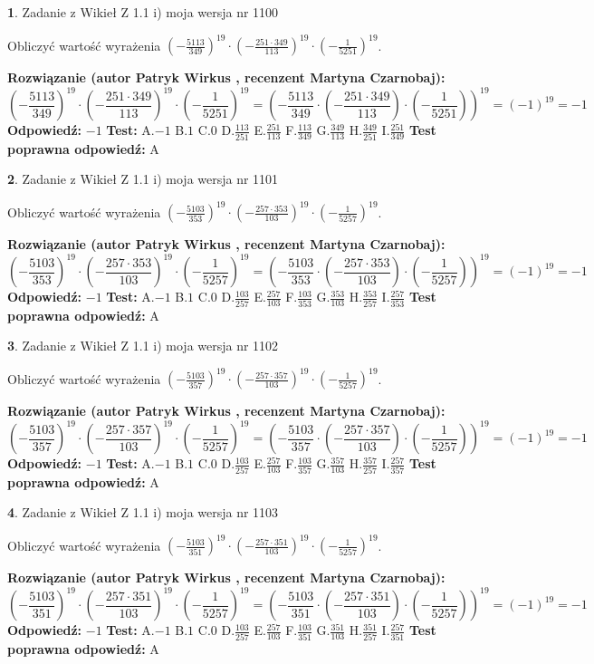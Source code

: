 \documentclass[12pt, a4paper]{article}
\theoremstyle{definition} %
\newtheorem{zad}{}
\newcommand{\zadStart}[1]{\begin{zad}#1\newline}
\newcommand{\zadStop}{\end{zad}}
\newcommand{\rozwStart}[2]{\noindent \textbf{Rozwiązanie (autor #1 , recenzent #2): }\newline}
\newcommand{\rozwStop}{\newline}
\newcommand{\odpStart}{\noindent \textbf{Odpowiedź:}\newline}
\newcommand{\odpStop}{\newline}
\newcommand{\testStart}{\noindent \textbf{Test:}\newline}
\newcommand{\testStop}{\newline}
\newcommand{\kluczStart}{\noindent \textbf{Test poprawna odpowiedź:}\newline}
\newcommand{\kluczStop}{\newline}
\begin{document}
\zadStart{Zadanie z Wikieł Z 1.1 i) moja wersja nr 1100}

Obliczyć wartość wyrażenia $(-\frac{5113}{349})^{19} \cdot (-\frac{251 \cdot 349}{113})^{19} \cdot (-\frac{1}{5251})^{19}$.
\zadStop
\rozwStart{Patryk Wirkus}{Martyna Czarnobaj}
$$(-\frac{5113}{349})^{19} \cdot (-\frac{251 \cdot 349}{113})^{19} \cdot (-\frac{1}{5251})^{19} = (-\frac{5113}{349} \cdot (-\frac{251 \cdot 349}{113}) \cdot (-\frac{1}{5251}))^{19} = (-1)^{19} = -1$$
\rozwStop
\odpStart
$-1$
\odpStop
\testStart
A.$-1$ B.$1$ C.$0$ D.$\frac{113}{251}$ E.$\frac{251}{113}$
F.$\frac{113}{349}$ G.$\frac{349}{113}$
H.$\frac{349}{251}$
I.$\frac{251}{349}$
\testStop
\kluczStart
A
\kluczStop



\zadStart{Zadanie z Wikieł Z 1.1 i) moja wersja nr 1101}

Obliczyć wartość wyrażenia $(-\frac{5103}{353})^{19} \cdot (-\frac{257 \cdot 353}{103})^{19} \cdot (-\frac{1}{5257})^{19}$.
\zadStop
\rozwStart{Patryk Wirkus}{Martyna Czarnobaj}
$$(-\frac{5103}{353})^{19} \cdot (-\frac{257 \cdot 353}{103})^{19} \cdot (-\frac{1}{5257})^{19} = (-\frac{5103}{353} \cdot (-\frac{257 \cdot 353}{103}) \cdot (-\frac{1}{5257}))^{19} = (-1)^{19} = -1$$
\rozwStop
\odpStart
$-1$
\odpStop
\testStart
A.$-1$ B.$1$ C.$0$ D.$\frac{103}{257}$ E.$\frac{257}{103}$
F.$\frac{103}{353}$ G.$\frac{353}{103}$
H.$\frac{353}{257}$
I.$\frac{257}{353}$
\testStop
\kluczStart
A
\kluczStop



\zadStart{Zadanie z Wikieł Z 1.1 i) moja wersja nr 1102}

Obliczyć wartość wyrażenia $(-\frac{5103}{357})^{19} \cdot (-\frac{257 \cdot 357}{103})^{19} \cdot (-\frac{1}{5257})^{19}$.
\zadStop
\rozwStart{Patryk Wirkus}{Martyna Czarnobaj}
$$(-\frac{5103}{357})^{19} \cdot (-\frac{257 \cdot 357}{103})^{19} \cdot (-\frac{1}{5257})^{19} = (-\frac{5103}{357} \cdot (-\frac{257 \cdot 357}{103}) \cdot (-\frac{1}{5257}))^{19} = (-1)^{19} = -1$$
\rozwStop
\odpStart
$-1$
\odpStop
\testStart
A.$-1$ B.$1$ C.$0$ D.$\frac{103}{257}$ E.$\frac{257}{103}$
F.$\frac{103}{357}$ G.$\frac{357}{103}$
H.$\frac{357}{257}$
I.$\frac{257}{357}$
\testStop
\kluczStart
A
\kluczStop



\zadStart{Zadanie z Wikieł Z 1.1 i) moja wersja nr 1103}

Obliczyć wartość wyrażenia $(-\frac{5103}{351})^{19} \cdot (-\frac{257 \cdot 351}{103})^{19} \cdot (-\frac{1}{5257})^{19}$.
\zadStop
\rozwStart{Patryk Wirkus}{Martyna Czarnobaj}
$$(-\frac{5103}{351})^{19} \cdot (-\frac{257 \cdot 351}{103})^{19} \cdot (-\frac{1}{5257})^{19} = (-\frac{5103}{351} \cdot (-\frac{257 \cdot 351}{103}) \cdot (-\frac{1}{5257}))^{19} = (-1)^{19} = -1$$
\rozwStop
\odpStart
$-1$
\odpStop
\testStart
A.$-1$ B.$1$ C.$0$ D.$\frac{103}{257}$ E.$\frac{257}{103}$
F.$\frac{103}{351}$ G.$\frac{351}{103}$
H.$\frac{351}{257}$
I.$\frac{257}{351}$
\testStop
\kluczStart
A
\kluczStop
\end{document}
